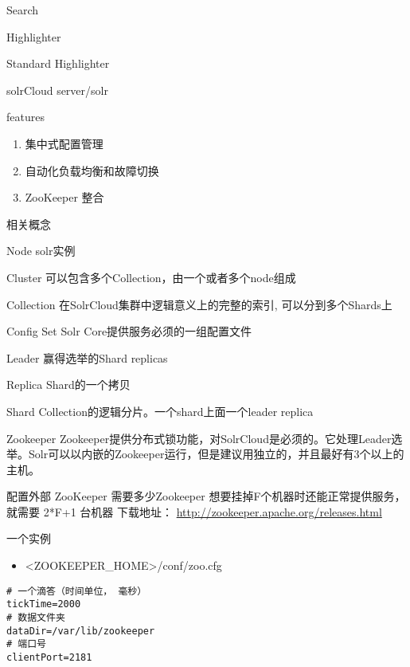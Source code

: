 \documentclass[presentation]{beamer}
\begin{document}
\begin{frame}[fragile,label={sec:org1ccf379}]{Search}
\begin{block}{Highlighter}
\begin{block}{Standard Highlighter}
\end{block}
\end{block}
\end{frame}

\begin{frame}[fragile,label={sec:org80f600b}]{solrCloud}
 server/solr
\begin{block}{features}
\begin{enumerate}
\item 集中式配置管理
\item 自动化负载均衡和故障切换
\item ZooKeeper 整合
\end{enumerate}
\end{block}


\begin{block}{相关概念}
\begin{block}{Node}
solr实例
\end{block}
\begin{block}{Cluster}
可以包含多个Collection，由一个或者多个node组成
\end{block}
\begin{block}{Collection}
在SolrCloud集群中逻辑意义上的完整的索引, 可以分到多个Shards上
\end{block}
\begin{block}{Config Set}
Solr Core提供服务必须的一组配置文件
\end{block}
\begin{block}{Leader}
赢得选举的Shard replicas
\end{block}
\begin{block}{Replica}
Shard的一个拷贝
\end{block}
\begin{block}{Shard}
Collection的逻辑分片。一个shard上面一个leader replica
\end{block}
\begin{block}{Zookeeper}
Zookeeper提供分布式锁功能，对SolrCloud是必须的。它处理Leader选举。Solr可以以内嵌的Zookeeper运行，但是建议用独立的，并且最好有3个以上的主机。 
\end{block}
\end{block}


\begin{block}{配置外部 ZooKeeper}
\alert{需要多少Zookeeper} 想要挂掉F个机器时还能正常提供服务，就需要 2*F+1 台机器
下载地址： \url{http://zookeeper.apache.org/releases.html}
\begin{block}{一个实例}
\begin{itemize}
\item <ZOOKEEPER\_HOME>/conf/zoo.cfg
\end{itemize}
\begin{verbatim}
# 一个滴答（时间单位， 毫秒）
tickTime=2000 
# 数据文件夹
dataDir=/var/lib/zookeeper
# 端口号
clientPort=2181
\end{verbatim}
\end{block}



\end{block}
\end{frame}
\end{document}
